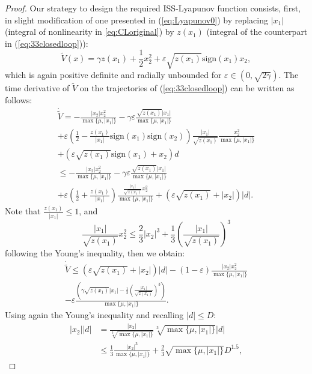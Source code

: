 \documentclass[letterpaper, 10 pt, conference]{ieeeconf}  %
\begin{document}
\begin{proof}
Our strategy to design the required ISS-Lyapunov function consists,
first, in slight modification of one presented in (\ref{eq:Lyapunov0})
by replacing $|x_{1}|$ (integral of nonlinearity in \eqref{eq:CLoriginal})
by $z(x_{1})$ (integral of the counterpart in (\ref{eq:33closedloop})):
\[
\tilde{V}(x)=\gamma z(x_{1})+\frac{1}{2}x_{2}^{2}+\varepsilon\sqrt{z(x_{1})}\text{sign}(x_{1})x_{2},
\]
which is again positive definite and radially unbounded for $\varepsilon\in(0,\sqrt{2\gamma})$.
The time derivative of $\tilde{V}$ on the trajectories of (\ref{eq:33closedloop})
can be written as follows:
\begin{gather*}
\dot{\tilde{V}}=-\frac{|x_{2}|x_{2}^{2}}{\max\{\mu,|x_{1}|\}}-\gamma\varepsilon\frac{\sqrt{z(x_{1})}|x_{1}|}{\max\{\mu,|x_{1}|\}}\\
+\varepsilon\left(\frac{1}{2}-\frac{z(x_{1})}{|x_{1}|}\text{sign}(x_{1})\text{sign}(x_{2})\right)\frac{|x_{1}|}{\sqrt{z(x_{1})}}\frac{x_{2}^{2}}{\max\{\mu,|x_{1}|\}}\\
+(\varepsilon\sqrt{z(x_{1})}\text{sign}(x_{1})+x_{2})d\\
\leq-\frac{|x_{2}|x_{2}^{2}}{\max\{\mu,|x_{1}|\}}-\gamma\varepsilon\frac{\sqrt{z(x_{1})}|x_{1}|}{\max\{\mu,|x_{1}|\}}\\
+\varepsilon\left(\frac{1}{2}+\frac{z(x_{1})}{|x_{1}|}\right)\frac{\frac{|x_{1}|}{\sqrt{z(x_{1})}}x_{2}^{2}}{\max\{\mu,|x_{1}|\}}+(\varepsilon\sqrt{z(x_{1})}+|x_{2}|)|d|.
\end{gather*}
Note that $\frac{z(x_{1})}{|x_{1}|}\leq1$, and
\[
\frac{|x_{1}|}{\sqrt{z(x_{1})}}x_{2}^{2}\leq\frac{2}{3}|x_{2}|^{3}+\frac{1}{3}\left(\frac{|x_{1}|}{\sqrt{z(x_{1})}}\right)^{3}
\]
following the Young's inequality, then we obtain:
\begin{gather*}
\dot{\tilde{V}}\leq(\varepsilon\sqrt{z(x_{1})}+|x_{2}|)|d|-(1-\varepsilon)\frac{|x_{2}|x_{2}^{2}}{\max\{\mu,|x_{1}|\}}\\
-\varepsilon\frac{\left(\gamma\sqrt{z(x_{1})}|x_{1}|-\frac{1}{2}\left(\frac{|x_{1}|}{\sqrt{z(x_{1})}}\right)^{3}\right)}{\max\{\mu,|x_{1}|\}}.
\end{gather*}
Using again the Young's inequality and recalling $|d|\leq D$:
\begin{align*}
|x_{2}||d| & =\frac{|x_{2}|}{\sqrt[3]{\max\{\mu,|x_{1}|\}}}\sqrt[3]{\max\{\mu,|x_{1}|\}}|d|\\
 & \leq\frac{1}{3}\frac{|x_{2}|^{3}}{\max\{\mu,|x_{1}|\}}+\frac{2}{3}\sqrt{\max\{\mu,|x_{1}|\}}D^{1.5},
\end{align*}

\end{proof}
\end{document}
